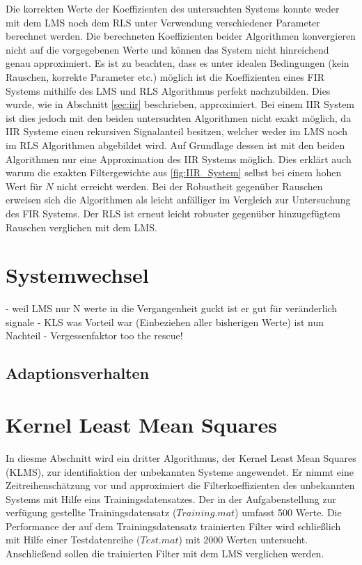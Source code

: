 Die korrekten Werte der Koeffizienten des untersuchten Systems konnte weder mit dem LMS noch dem RLS unter Verwendung verschiedener Parameter berechnet werden.
Die berechneten Koeffizienten beider Algorithmen konvergieren nicht auf die vorgegebenen Werte und können das System nicht hinreichend genau approximiert.
Es ist zu beachten, dass es unter idealen Bedingungen (kein Rauschen, korrekte Parameter etc.) möglich ist die Koeffizienten eines FIR Systems mithilfe des LMS und RLS Algorithmus perfekt nachzubilden.
Dies wurde, wie in Abschnitt \ref{sec:iir} beschrieben, approximiert.
Bei einem IIR System ist dies jedoch mit den beiden untersuchten Algorithmen nicht exakt möglich, da IIR Systeme einen rekursiven Signalanteil besitzen, welcher weder im LMS noch im RLS Algorithmen abgebildet wird.
Auf Grundlage dessen ist mit den beiden Algorithmen nur eine Approximation des IIR Systems möglich.
Dies erklärt auch warum die exakten Filtergewichte aus \ref{fig:IIR_System} selbst bei einem hohen Wert für $N$ nicht erreicht werden.
Bei der Robustheit gegenüber Rauschen erweisen sich die Algorithmen als leicht anfälliger im Vergleich zur Untersuchung des FIR Systems.
Der RLS ist erneut leicht robuster gegenüber hinzugefügtem Rauschen verglichen mit dem LMS.





\section{Systemwechsel}
\label{sec:Systemwechsel}

- weil LMS nur N werte in die Vergangenheit guckt ist er gut für veränderlich signale
- KLS was Vorteil war (Einbeziehen aller bisherigen Werte) ist nun Nachteil
- Vergessenfaktor too the rescue!


\subsection{Adaptionsverhalten}






\section{Kernel Least Mean Squares}
\label{sec:klms}

In diesme Abschnitt wird ein dritter Algorithmus, der Kernel Least Mean Squares (KLMS), zur identifiaktion der unbekannten Systeme angewendet.
Er nimmt eine Zeitreihenschätzung vor und approximiert die Filterkoeffizienten des unbekannten Systems mit Hilfe eins Trainingsdatensatzes.
Der in der Aufgabenstellung zur verfügung gestellte Trainingsdatensatz ($Training.mat$) umfasst 500 Werte.
Die Performance der auf dem Trainingsdatensatz trainierten Filter wird schließlich mit Hilfe einer Testdatenreihe ($Test.mat$) mit 2000 Werten untersucht.
Anschließend sollen die trainierten Filter mit dem LMS verglichen werden.

